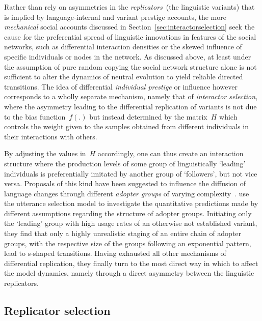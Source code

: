 Rather than rely on asymmetries in the \emph{replicators}~(the linguistic variants) that is implied by language-internal and variant prestige accounts, the more \emph{mechanical} social accounts discussed in Section~\ref{sec:interactorselection} seek the cause for the preferential spread of linguistic innovations in features of the social networks, such as differential interaction densities or the skewed influence of specific individuals or nodes in the network.
As discussed above, at least under the assumption of pure random copying the social network structure alone is not sufficient to alter the dynamics of neutral evolution to yield reliable directed transitions.
The idea of differential \emph{individual prestige} or influence however corresponds to a wholly separate mechanism, namely that of \emph{interactor selection}, where the asymmetry leading to the differential replication of variants is not due to the bias function~$f(.)$ but instead determined by the matrix~$H$ which controls the weight given to the samples obtained from different individuals in their interactions with others.

By adjusting the values in~$H$ accordingly, one can thus create an interaction structure where the production levels of some group of linguistically `leading' individuals is preferentially imitated by another group of `followers', but not vice versa. Proposals of this kind have been suggested to influence the diffusion of language changes through different \emph{adopter groups} of varying complexity~\citep{Labov2001,Rogers1962,Milroy1985}.
\citet{Blythe2012} use the utterance selection model to investigate the quantitative predictions made by different assumptions regarding the structure of adopter groups. Initiating only the `leading' group with high usage rates of an otherwise not established variant, they find that only a highly unrealistic staging of an entire chain of adopter groups, with the respective size of the groups following an exponential pattern, lead to s-shaped transitions. Having exhausted all other mechanisms of differential replication, they finally turn to the most direct way in which to affect the model dynamics, namely through a direct asymmetry between the linguistic replicators.

\subsection{Replicator selection}\label{sec:usmreplicator}


